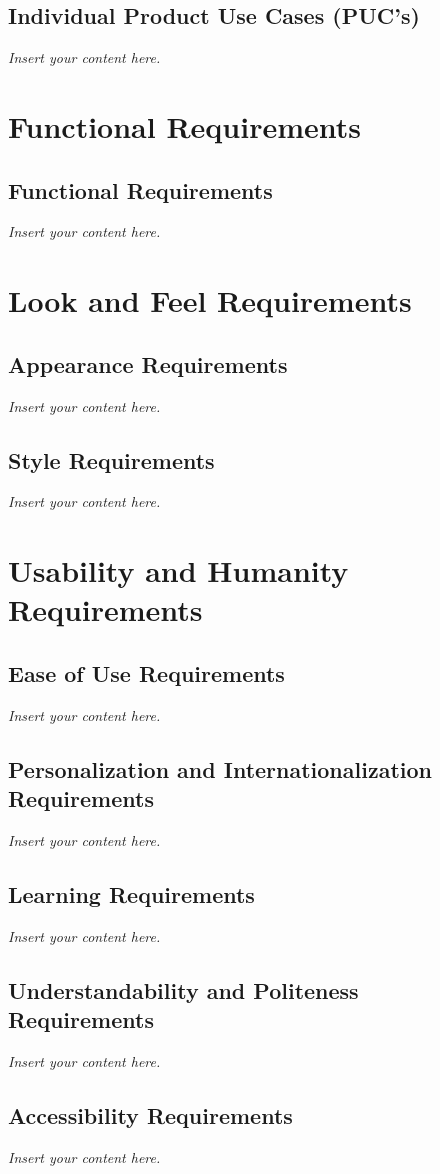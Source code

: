 \documentclass[12pt]{article}
\newcommand{\lips}{\textit{Insert your content here.}}
\begin{document}
\subsection{Individual Product Use Cases (PUC's)}
\lips

\section{Functional Requirements}
\subsection{Functional Requirements}
\lips

\section{Look and Feel Requirements}
\subsection{Appearance Requirements}
\lips
\subsection{Style Requirements}
\lips

\section{Usability and Humanity Requirements}
\subsection{Ease of Use Requirements}
\lips
\subsection{Personalization and Internationalization Requirements}
\lips
\subsection{Learning Requirements}
\lips
\subsection{Understandability and Politeness Requirements}
\lips
\subsection{Accessibility Requirements}
\lips
\end{document}
